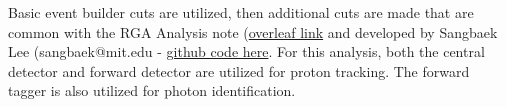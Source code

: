     
    Basic event builder cuts are utilized, then additional cuts are made that are common with the RGA Analysis note (\href{https://www.overleaf.com/project/5ea737720942930001ff5e9c}{overleaf link} and developed by Sangbaek Lee (sangbaek@mit.edu - \href{https://github.com/Sangbaek/analysis_code/tree/analysis/pid}{github code here}. For this analysis, both the central detector and forward detector are utilized for proton tracking. The forward tagger is also utilized for photon identification. 
    
\fi



